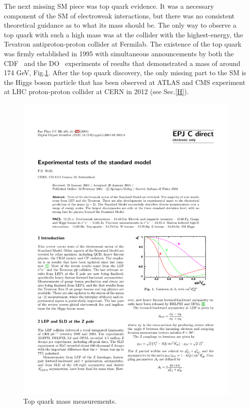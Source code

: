 The next missing SM piece was top quark evidence. It was a necessary component of the SM of electroweak interactions, but there was no consistent theoretical guidance as to what its mass should be. The only way to observe a top quark with such a high mass was at the collider with the highest-energy, the Tevatron antiproton-proton collider at Fermilab. The existence of the top quark was firmly established in 1995 with simultaneous announcements by both the CDF~\cite{PhysRevLett.73.225} and the DO~\cite{D0:1995jca} experiments of results that demonstrated a mass of around 174 GeV, Fig.\ref{Wells2004_Article_ExperimentalTestsOfTheStandard}.
After the top quark discovery, the only missing part to the SM is the Higgs boson particle  that has been observed at ATLAS and CMS experiment at LHC proton-proton collider at CERN in 2012 (see Sec.\ref{H}).  
\begin{figure}
\centering
\includegraphics[scale= 0.8]{../Cap1/Wells2004_Article_ExperimentalTestsOfTheStandard}
\caption{Top quark mass measurements.}
\label{Wells2004_Article_ExperimentalTestsOfTheStandard}
\end{figure}


